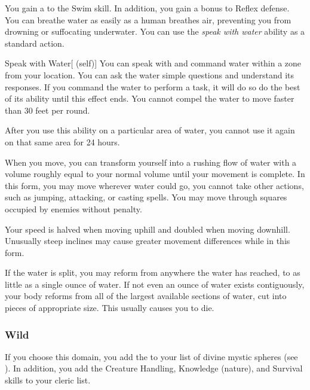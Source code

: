              You gain a   to the Swim skill.
            In addition, you gain a  bonus to Reflex defense.
             You can breathe water as easily as a human breathes air, preventing you from drowning or suffocating underwater.
             You can use the \textit{speak with water} ability as a standard action.
            \begin{attuneability}{Speak with Water}[ (self)]
                You can speak with and command water within a \areahuge zone from your location.
                You can ask the water simple questions and understand its responses.
                If you command the water to perform a task, it will do so do the best of its ability until this effect ends.
                You cannot compel the water to move faster than 30 feet per round.

                After you use this ability on a particular area of water, you cannot use it again on that same area for 24 hours.
            \end{attuneability}
            When you move, you can transform yourself into a rushing flow of water with a volume roughly equal to your normal volume until your movement is complete.
            In this form, you may move wherever water could go, you cannot take other actions, such as jumping, attacking, or casting spells.
            You may move through squares occupied by enemies without penalty.
            \par Your speed is halved when moving uphill and doubled when moving downhill.
            Unusually steep inclines may cause greater movement differences while in this form.
            \par If the water is split, you may reform from anywhere the water has reached, to as little as a single ounce of water.
            If not even an ounce of water exists contiguously, your body reforms from all of the largest available sections of water, cut into pieces of appropriate size.
            This usually causes you to die.

        \subsubsection{Wild}
            If you choose this domain, you add the   to your list of divine mystic spheres (see ).
            In addition, you add the Creature Handling, Knowledge (nature), and Survival skills to your cleric  list.

